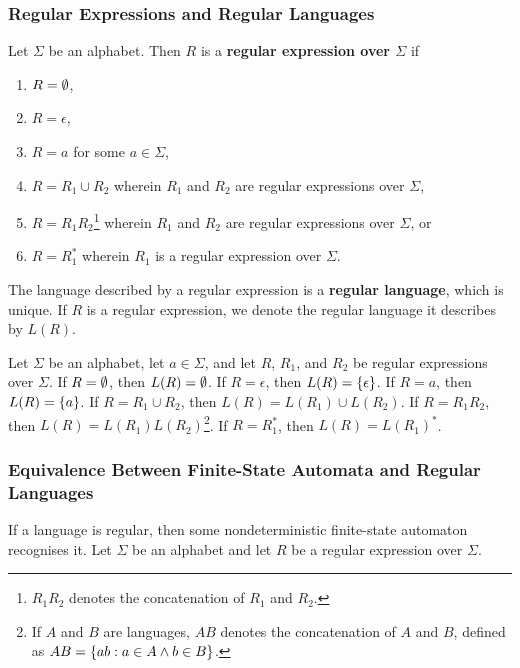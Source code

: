 \subsubsection{Regular Expressions and Regular Languages}

\Bdf
    Let \(\Sigma\) be an alphabet. Then \(R\) is a {\bf regular expression over
    \(\Sigma\)} if
    \begin{enumerate}
        \item \(R = \emptyset\),
        \item \(R = \epsilon\),
        \item \(R = a\) for some \(a \in \Sigma\),
        \item \(R = R_1 \cup R_2\) wherein \(R_1\) and \(R_2\) are regular
        expressions over \(\Sigma\),
        \item \(R = R_1 R_2\)\footnote{\(R_1 R_2\) denotes the concatenation of
        \(R_1\) and \(R_2\).} wherein \(R_1\) and \(R_2\) are regular
        expressions over \(\Sigma\), or
        \item \(R = R_1^*\) wherein \(R_1\) is a regular expression over
        \(\Sigma\).
    \end{enumerate}
\Edf

The language described by a regular expression is a {\bf regular language},
which is unique. If \(R\) is a regular expression, we denote the regular
language it describes by \(L(R)\).

Let \(\Sigma\) be an alphabet, let \(a \in \Sigma\), and let \(R\), \(R_1\), and
\(R_2\) be regular expressions over \(\Sigma\). If \(R = \emptyset\), then \(L(R) =
\emptyset\). If \(R = \epsilon\), then \(L(R) = \{\epsilon\}\). If \(R = a\), then
\(L(R) = \{a\}\). If \(R = R_1 \cup R_2\), then \(L(R) = L(R_1) \cup L(R_2)\).
If \(R = R_1 R_2\), then \(L(R) = L(R_1) L(R_2)\)\footnote{If \(A\) and \(B\)
are languages, \(A B\) denotes the concatenation of \(A\) and \(B\), defined
as \(A B = \{a b : a \in A \land b \in B\}\).}. If \(R = R_1^*\), then \(L(R) =
L(R_1)^*\).

\subsubsection{Equivalence Between Finite-State Automata and Regular Languages}

\Blm
    \label{lem1}
    If a language is regular, then some nondeterministic finite-state automaton
    recognises it.
\Elm
\Bpr
    Let \(\Sigma\) be an alphabet and let \(R\) be a regular expression over
    \(\Sigma\).

